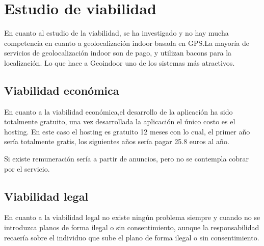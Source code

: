 \section{Estudio de viabilidad}

En cuanto al estudio de la viabilidad, se ha investigado y no hay mucha competencia en cuanto a geolocalización indoor basada en GPS.La mayoría de servicios de geolocalización indoor son de pago, y utilizan bacons para la localización. Lo que hace a Geoindoor uno de los sistemas más atractivos.


\subsection{Viabilidad económica}

En cuanto a la viabilidad económica,el desarrollo de la aplicación ha sido totalmente gratuito, una vez desarrollada la aplicación el único costo es el hosting. En este caso el hosting es gratuito 12 meses con lo cual, el primer año sería totalmente gratis, los siguientes años sería pagar 25.8 euros al año.

Si existe remuneración sería a partir de anuncios, pero no se contempla cobrar por el servicio. 

\subsection{Viabilidad legal}

En cuanto a la viabilidad legal no existe ningún problema siempre y cuando no se introduzca planos de forma ilegal o sin consentimiento, aunque la responsabilidad recaería sobre el individuo que sube el plano de forma ilegal o sin consentimiento.

